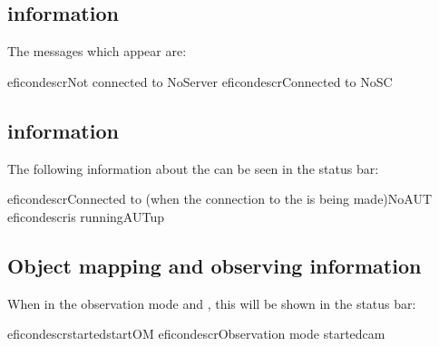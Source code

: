
\subsection{\gdserver information}

The \gdserver messages which appear are:

\begin{gdreficon}
  \jb{}eficondescr{Not connected to \gdserver}{NoServer}
  \jb{}eficondescr{Connected to \gdserver}{NoSC}
\end{gdreficon}


\subsection{\gdaut information}

The following information about the \gdaut can be seen in the status bar:

\begin{gdreficon}
  \jb{}eficondescr{Connected to \gdserver (when the connection to the \gdaut is being made)}{NoAUT}
  \jb{}eficondescr{\gdaut is running}{AUTup}
\end{gdreficon}


\subsection{Object mapping and observing information}

When in the observation mode and \gdomm{}, this will be shown in the status bar:

\begin{gdreficon}
  \jb{}eficondescr{\gdomm started}{startOM}
  \jb{}eficondescr{Observation mode started}{cam}
\end{gdreficon}


